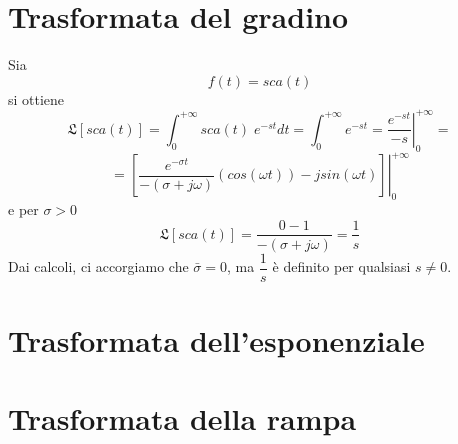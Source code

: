 \documentclass[a4paper]{report}
\begin{document}
\section{Trasformata del gradino}
Sia
\[
f(t) = sca(t)
\]
si ottiene
\[
\mathfrak{L}[sca(t)] = \int_{0}^{+\infty} sca(t)\; e^{-st} dt =
\int_{0}^{+\infty} e^{-st} = \left
. \dfrac{e^{-st}}{-s}\right|^{+\infty}_{0} =
\]
\[
 = \left . \left [ \dfrac{e^{-\sigma
    t}}{-(\sigma + j \omega)} (cos(\omega t)) - j sin(\omega t)
  \right] \right|^{+\infty}_{0}
\]
e per $\sigma > 0$
\begin{equation}\label{Trasformata del gradino}
  \mathfrak{L}[sca(t)] = \dfrac{0 - 1}{- (\sigma + j \omega)} = \dfrac{1}{s}
\end{equation}
Dai calcoli, ci accorgiamo che $\bar{\sigma} = 0$, ma $\dfrac{1}{s}$
\`e definito per qualsiasi $s \neq 0$.

\section{Trasformata dell'esponenziale}

\section{Trasformata della rampa}
\end{document}
